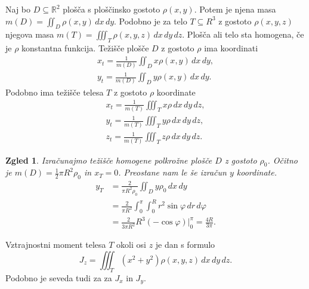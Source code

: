 \documentclass[10pt, a4paper]{article}
\newtheorem{zgled}{Zgled}[section]
\newcommand{\R}{\mathbb {R}}
\begin{document}
Naj bo $D \subseteq \R^2$ plošča s ploščinsko gostoto $\rho (x, y)$.
Potem je njena masa $m(D) = \iint_D \rho(x, y)\, dx\, dy$.
Podobno je za telo $T \subseteq R^3$ z gostoto $\rho(x, y, z)$ njegova masa 
$m(T) = \iiint_T \rho(x, y, z)\, dx\, dy\, dz$.
Plošča ali telo sta homogena, če je $\rho$ konstantna funkcija.
Težišče plošče $D$ z gostoto $\rho$ ima koordinati
\begin{gather*}
    x_t = \frac{1}{m(D)} \iint_D x \rho(x, y)\, dx\,dy,\\
    y_t = \frac{1}{m(D)} \iint_D y \rho(x, y)\, dx\,dy.
\end{gather*}
Podobno ima težišče telesa $T$ z gostoto $\rho$ koordinate 
\begin{gather*}
    x_t = \frac{1}{m(T)} \iiint_T x \rho\, dx\,dy\,dz,\\
    y_t = \frac{1}{m(T)} \iiint_T y \rho\, dx\,dy\,dz,\\
    z_t = \frac{1}{m(T)} \iiint_T z \rho\, dx\,dy\,dz.   
\end{gather*}

\begin{zgled}
    Izračunajmo težišče homogene polkrožne plošče $D$ z gostoto $\rho_0$.
    Očitno je $m(D) = \frac{1}{2} \pi R^2\rho_0$ in $x_T = 0$.
    Preostane nam le še izračun $y$ koordinate.
    \begin{align*}
        y_T &= \frac{2}{\pi R^2 \rho_0} \iint_D y \rho_0\, dx\, dy\\
        &= \frac{2}{\pi R^2} \int_0 ^\pi \int_0 ^R r^2 \sin \varphi \, dr\, d\varphi\\
        &= \frac{2}{3\pi R^2} R^3 (- \cos \varphi)\Big|_0 ^\pi = \frac{4R}{3 \pi}.
    \end{align*}
\end{zgled}

Vztrajnostni moment telesa $T$ okoli osi $z$ je dan s formulo 
$$J_z = \iiint_T (x^2 + y^2) \rho(x, y, z)\, dx\, dy\, dz.$$
Podobno je seveda tudi za za $J_x$ in $J_y$.
\end{document}
